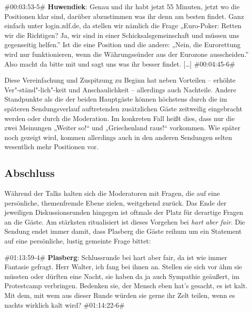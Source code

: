 \begin{description}
\begin{linenumbers}[1]
		\#00:03:53-5\# \textbf{Huwendiek}: Genau und ihr habt jetzt 55 Minuten, jetzt wo die Positionen klar sind, darüber abzustimmen was ihr denn am besten findet. Ganz einfach unter login.zdf.de, da stellen wir nämlich die Frage „Euro-Poker: Retten wir die Richtigen? Ja, wir sind in einer Schicksalsgemeinschaft und müssen uns gegenseitig helfen.” Ist die eine Position und die andere: „Nein, die Eurorettung wird nur funktionieren, wenn die Währungssünder aus der Eurozone ausscheiden.” Also macht da bitte mit und sagt uns was ihr besser findet. [\ldots] \#00:04:45-6\#
	\end{linenumbers}
\end{description}

Diese Vereinfachung und Zuspitzung zu Beginn hat neben Vorteilen – erhöhte Ver"-ständ"-lich"-keit und Anschaulichkeit – allerdings auch Nachteile. Andere Standpunkte als die der beiden Hauptgäste können höchstens durch die im späteren Sendungsverlauf auftretenden zusätzlichen Gäste zeitweilig eingebracht werden oder durch die Moderation. Im konkreten Fall heißt dies, dass nur die zwei Meinungen „Weiter so!“ und „Griechenland raus!“ vorkommen. Wie später noch gezeigt wird, kommen allerdings auch in den anderen Sendungen selten wesentlich mehr Positionen vor.

\subsection{Abschluss}

Während der Talks halten sich die Moderatoren mit Fragen, die auf eine persönliche, themenfremde Ebene zielen, weitgehend zurück. Das Ende der jeweiligen Diskussionsrunden hingegen ist oftmals der Platz für derartige Fragen an die Gäste. Am stärksten ritualisiert ist dieses Vorgehen bei \textit{hart aber fair}. Die Sendung endet immer damit, dass Plasberg die Gäste reihum um ein Statement auf eine persönliche, lustig gemeinte Frage bittet:

\begin{description}
	\begin{linenumbers}[1]
		\item \#01:13:59-4\# \textbf{Plasberg}: Schlussrunde bei hart aber fair, da ist wie immer Fantasie gefragt. Herr Walter, ich fang bei ihnen an. Stellen sie sich vor ähm sie müssten oder dürften eine Nacht, sie haben da ja auch Sympathie geäußert, im Protestcamp verbringen. Bedenken sie, der Mensch eben hat's gesacht, es ist kalt. Mit dem, mit wem aus dieser Runde würden sie gerne ihr Zelt teilen, wenn es nachts wirklich kalt wird? \#01:14:22-6\#
	\end{linenumbers}
\end{description}

